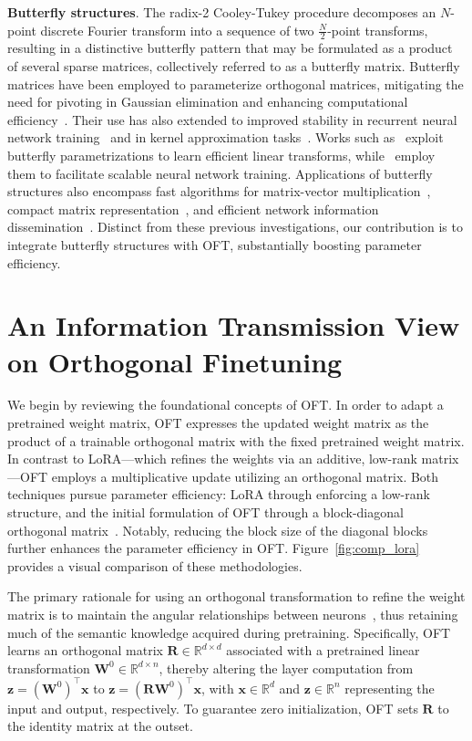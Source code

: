 \textbf{Butterfly structures}. The radix-2 Cooley-Tukey procedure decomposes an $N$-point discrete Fourier transform into a sequence of two $\frac{N}{2}$-point transforms, resulting in a distinctive butterfly pattern that may be formulated as a product of several sparse matrices, collectively referred to as a butterfly matrix. Butterfly matrices have been employed to parameterize orthogonal matrices, mitigating the need for pivoting in Gaussian elimination and enhancing computational efficiency~\cite{parker1995random}. Their use has also extended to improved stability in recurrent neural network training~\cite{jing2017tunable} and in kernel approximation tasks~\cite{munkhoeva2018quadrature}. Works such as~\cite{dao2019learning,dao2019kaleidoscope} exploit butterfly parametrizations to learn efficient linear transforms, while~\cite{chen2022pixelated,dao2022monarch} employ them to facilitate scalable neural network training. Applications of butterfly structures also encompass fast algorithms for matrix-vector multiplication~\cite{michielssen1996multilevel,o2010algorithm}, compact matrix representation~\cite{li2015butterfly}, and efficient network information dissemination~\cite{klasing1994broadcasting,li2003linear,rajasingh2016transmission}. Distinct from these previous investigations, our contribution is to integrate butterfly structures with OFT, substantially boosting parameter efficiency.

\section{An Information Transmission View on Orthogonal Finetuning}

We begin by reviewing the foundational concepts of OFT. In order to adapt a pretrained weight matrix, OFT expresses the updated weight matrix as the product of a trainable orthogonal matrix with the fixed pretrained weight matrix. In contrast to LoRA—which refines the weights via an additive, low-rank matrix—OFT employs a multiplicative update utilizing an orthogonal matrix. Both techniques pursue parameter efficiency: LoRA through enforcing a low-rank structure, and the initial formulation of OFT through a block-diagonal orthogonal matrix~\cite{qiu2023controlling}. Notably, reducing the block size of the diagonal blocks further enhances the parameter efficiency in OFT. Figure~\ref{fig:comp_lora} provides a visual comparison of these methodologies. 

The primary rationale for using an orthogonal transformation to refine the weight matrix is to maintain the angular relationships between neurons~\cite{liu2018learning,liu2021orthogonal,qiu2023controlling}, thus retaining much of the semantic knowledge acquired during pretraining. Specifically, OFT learns an orthogonal matrix $\bm{R} \in \mathbb{R}^{d \times d}$ associated with a pretrained linear transformation $\bm{W}^0 \in \mathbb{R}^{d \times n}$, thereby altering the layer computation from $\bm{z}=(\bm{W}^0)^\top\bm{x}$ to $\bm{z}=(\bm{R}\bm{W}^0)^\top\bm{x}$, with $\bm{x} \in \mathbb{R}^d$ and $\bm{z} \in \mathbb{R}^n$ representing the input and output, respectively. To guarantee zero initialization, OFT sets $\bm{R}$ to the identity matrix at the outset. 

